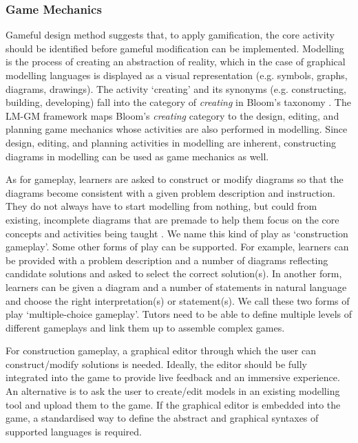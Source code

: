 \documentclass[conference]{IEEEtran}
\begin{document}
\subsubsection{Game Mechanics} 
\label{Game Mechanics} 
Gameful design method \cite{deterding2015lens} suggests that, to apply gamification, the core activity should be identified before gameful modification can be implemented. Modelling is the process of creating an abstraction of reality, which in the case of graphical modelling languages is displayed as a visual representation (e.g. symbols, graphs, diagrams, drawings). The activity `creating' and its synonyms (e.g. constructing, building, developing) fall into the category of \emph{creating} in Bloom's taxonomy \cite{krathwohl2002revision}. The LM-GM framework \cite{arnab2015mapping} maps Bloom's \emph{creating} category to the design, editing, and planning game mechanics whose activities are also performed in modelling. Since design, editing, and planning activities in modelling are inherent, constructing diagrams in modelling can be used as game mechanics as well. 

As for gameplay, learners are asked to construct or modify diagrams so that the diagrams become consistent with a given problem description and instruction. They do not always have to start modelling from nothing, but could from existing, incomplete diagrams that are premade to help them focus on the core concepts and activities being taught \cite{deterding2015lens}. We name this kind of play as `construction gameplay'. Some other forms of play can be supported. For example, learners can be provided with a problem description and a number of diagrams reflecting candidate solutions and asked to select the correct solution(s). In another form, learners can be given a diagram and a number of statements in natural language and choose the right interpretation(s) or statement(s). We call these two forms of play `multiple-choice gameplay'. Tutors need to be able to define multiple levels of different gameplays and link them up to assemble complex games. 

For construction gameplay, a graphical editor through which the user can construct/modify solutions is needed. Ideally, the editor should be fully integrated into the game to provide live feedback and an immersive experience. An alternative is to ask the user to create/edit models in an existing modelling tool and upload them to the game. If the graphical editor is embedded into the game, a standardised way to define the abstract and graphical syntaxes of supported languages is required. 
\end{document}
